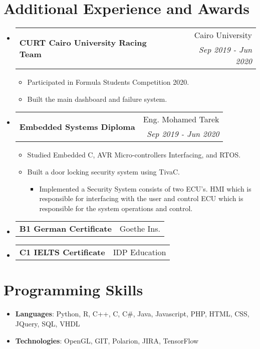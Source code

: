 \documentclass[letterpaper,11pt]{article}
\makeatletter
\newcommand{\CvSubheadingWithoutTitle}[3]{
  \vspace{-1pt}\item
    \begin{tabular*}{0.97\textwidth}{l@{\extracolsep{\fill}}r}
    \multirow{2}{*}{\textbf{#1}} & #2 \\
     & \textit{\small #3} \\
    \end{tabular*}\vspace{-5pt}
}
\newcommand{\CvSubSubheadingWithoutTitleAndDate}[2]{
  \vspace{-1pt}\item
    \begin{tabular*}{0.97\textwidth}{l@{\extracolsep{\fill}}r}
    {\textbf{#1}} & #2 \\
    \end{tabular*}\vspace{-10pt}
}
\newcommand{\CvSubHeadingListStart}{\begin{itemize}[leftmargin=*,topsep = 0pt]}
\newcommand{\CvSubHeadingListEnd}{\end{itemize}}
\makeatother
\begin{document}
%
%
\section{Additional Experience and Awards}
    \CvSubHeadingListStart
        \CvSubheadingWithoutTitle
        {CURT Cairo University Racing Team}{Cairo University}
        {Sep 2019 - Jun 2020 }
            {\begin{itemize}[topsep = -5pt, itemsep = -2pt]
                \item Participated in Formula Students Competition 2020.
                \item Built the main dashboard and failure system.
            \end{itemize}}
    \CvSubheadingWithoutTitle
        {Embedded Systems Diploma}{Eng. Mohamed Tarek}
        {Sep 2019 - Jun 2020 }
            \begin{itemize}[topsep = -5pt, itemsep = -2pt]
                \item Studied Embedded C, AVR Micro-controllers Interfacing, and RTOS.
                \item Built a door locking security system using TivaC.
                \begin{itemize}[topsep = -1pt]
                    \item Implemented a Security System consists of two ECU’s. HMI which is responsible for interfacing with 
                    the user and control ECU which is responsible for the system operations and control.
                \end{itemize} 
            \end{itemize}
    \CvSubSubheadingWithoutTitleAndDate
    {B1 German Certificate} {Goethe Ins.}
    \CvSubSubheadingWithoutTitleAndDate
    {C1 IELTS Certificate} { IDP Education}
    \CvSubHeadingListEnd
%
\section{Programming Skills}
 \CvSubHeadingListStart
   \item{
     \textbf{Languages}{: Python, R, C++, C, C\#, Java, Javascript, PHP, HTML, CSS, JQuery, SQL, VHDL}}
   \item{
    \textbf{Technologies}{: OpenGL, GIT, Polarion, JIRA, TensorFlow}
   }  
 \CvSubHeadingListEnd


\end{document}
